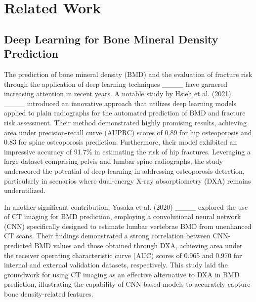 \section{Related Work}
\subsection{Deep Learning for Bone Mineral Density Prediction}

The prediction of bone mineral density (BMD) and the evaluation of fracture risk through the application of deep learning techniques ____ have garnered increasing attention in recent years. A notable study by Hsieh et al. (2021) ____ introduced an innovative approach that utilizes deep learning models applied to plain radiographs for the automated prediction of BMD and fracture risk assessment. Their method demonstrated highly promising results, achieving area under precision-recall curve (AUPRC) scores of 0.89 for hip osteoporosis and 0.83 for spine osteoporosis prediction. Furthermore, their model exhibited an impressive accuracy of 91.7\% in estimating the risk of hip fractures. Leveraging a large dataset comprising pelvis and lumbar spine radiographs, the study underscored the potential of deep learning in addressing osteoporosis detection, particularly in scenarios where dual-energy X-ray absorptiometry (DXA) remains underutilized.

In another significant contribution, Yasaka et al. (2020) ____ explored the use of CT imaging for BMD prediction, employing a convolutional neural network (CNN) specifically designed to estimate lumbar vertebrae BMD from unenhanced CT scans. Their findings demonstrated a strong correlation between CNN-predicted BMD values and those obtained through DXA, achieving area under the receiver operating characteristic curve (AUC) scores of 0.965 and 0.970 for internal and external validation datasets, respectively. This study laid the groundwork for using CT imaging as an effective alternative to DXA in BMD prediction, illustrating the capability of CNN-based models to accurately capture bone density-related features.

